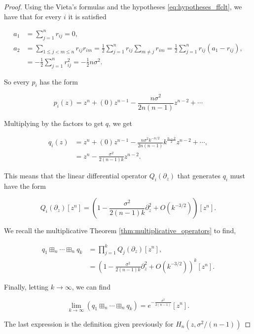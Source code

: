\begin{proof}
    Using the Vieta's formulas and the hypotheses \eqref{eq:hypotheses_ffclt}, we have that for every $i$ it is satisfied

    \begin{align*}
        a_1 &= \sum_{j=1}^n r_{ij} = 0,\\
        a_2 &= \sum_{1 \le j < m \le n} r_{ij}r_{im} = \frac12 \sum_{j=1}^n r_{ij}\sum_{m\neq j} r_{im} = \frac12 \sum_{j=1}^n r_{ij} \left(a_1 - r_{ij}\right),\\
        &= - \frac12 \sum_{j=1}^n r_{ij}^2 = - \frac12 n\sigma^2.
    \end{align*}

    So every $p_i$ has the form

    \begin{equation*}
        p_i(z) = z^n + (0)z^{n-1} - \frac{n\sigma^2}{2n(n-1)} z^{n-2} + \cdots
    \end{equation*}

    Multiplying by the factors to get $q$, we get

    \begin{align*}
        q_i(z) &= z^n + (0)z^{n-1} - \frac{n\sigma^2k^{-n/2}}{2n(n-1)} k^{\frac{n-2}{2}}z^{n-2} + \cdots ,\\
        &= z^n - \frac{\sigma^2}{2(n-1)k}z^{n-2}.
    \end{align*}

    This means that the linear differential operator $Q_i(\partial_z)$ that generates $q_i$ must have the form

    \begin{equation*}
        Q_i(\partial_z)[z^n] = \left( 1 - \frac{\sigma^2}{2(n-1)k}\partial_z^2 + O(k^{-3/2})\right)[z^n].
    \end{equation*}

    We recall the multiplicative Theorem \ref{thm:multiplicative_operators} to find,

    \begin{align*}
        q_1 \boxplus_n \cdots \boxplus_n q_k &= \prod_{j=1}^k Q_j(\partial_z)[z^n], \\
        &= \left( 1 - \frac{\sigma^2}{2(n-1)k}\partial_z^2 + O(k^{-3/2})\right)^k[z^n].
    \end{align*}

    Finally, letting $k\to\infty$, we can find

    \begin{equation*}
        \lim_{k\to\infty} \left(q_1 \boxplus_n \cdots \boxplus_n q_k\right) = e^{ - \frac{\sigma^2}{2(n-1)} }[z^n].
    \end{equation*}

    The last expression is the definition given previously for $H_n(z,\sigma^2/(n-1))$
\end{proof}


